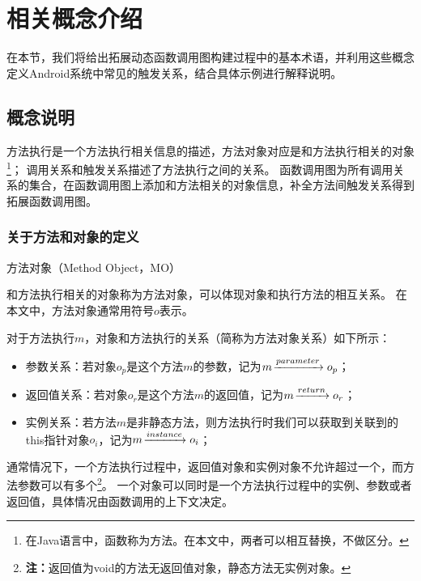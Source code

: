 \chapter{相关概念介绍}
\label{chp:definition}


在本节，我们将给出拓展动态函数调用图构建过程中的基本术语，并利用这些概念定义Android系统中常见的触发关系，结合具体示例进行解释说明。

\section{概念说明}
方法执行是一个方法执行相关信息的描述，方法对象对应是和方法执行相关的对象\footnote{在Java语言中，函数称为方法。在本文中，两者可以相互替换，不做区分。}；
调用关系和触发关系描述了方法执行之间的关系。
函数调用图为所有调用关系的集合，在函数调用图上添加和方法相关的对象信息，补全方法间触发关系得到拓展函数调用图。

\subsection{关于方法和对象的定义}

\begin{Def}
	方法对象（Method Object，MO）
\end{Def}

和方法执行相关的对象称为方法对象，可以体现对象和执行方法的相互关系。
在本文中，方法对象通常用符号$o$表示。
	

	对于方法执行$m$，对象和方法执行的关系（简称为方法对象关系）如下所示：
	\begin{itemize}
				\setlength{\itemsep}{1pt}
				\setlength{\parskip}{0pt}
				\setlength{\parsep}{0pt}
		\item 参数关系：若对象$o_p$是这个方法$m$的参数，记为$m \joinrel\xrightarrow{parameter} o_p$；%
		\item 返回值关系：若对象$o_r$是这个方法$m$的返回值，记为$m \joinrel\xrightarrow{return} o_r$；%
		\item 实例关系：若方法$m$是非静态方法，则方法执行时我们可以获取到关联到的this指针对象$o_i$，记为$m \joinrel\xrightarrow{instance} o_i$；%
	\end{itemize}

通常情况下，一个方法执行过程中，返回值对象和实例对象不允许超过一个，而方法参数可以有多个\footnote{\textbf{注：}返回值为void的方法无返回值对象，静态方法无实例对象。}。
一个对象可以同时是一个方法执行过程中的实例、参数或者返回值，具体情况由函数调用的上下文决定。



